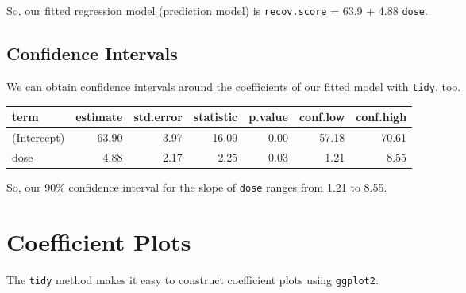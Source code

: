 \documentclass[
]{book}
\newenvironment{Shaded}{\begin{snugshade}}{\end{snugshade}}
\newcommand{\DataTypeTok}[1]{\textcolor[rgb]{0.13,0.29,0.53}{#1}}
\newcommand{\DecValTok}[1]{\textcolor[rgb]{0.00,0.00,0.81}{#1}}
\newcommand{\FloatTok}[1]{\textcolor[rgb]{0.00,0.00,0.81}{#1}}
\newcommand{\KeywordTok}[1]{\textcolor[rgb]{0.13,0.29,0.53}{\textbf{#1}}}
\newcommand{\NormalTok}[1]{#1}
\newcommand{\OperatorTok}[1]{\textcolor[rgb]{0.81,0.36,0.00}{\textbf{#1}}}
\newcommand{\OtherTok}[1]{\textcolor[rgb]{0.56,0.35,0.01}{#1}}
\newcommand{\StringTok}[1]{\textcolor[rgb]{0.31,0.60,0.02}{#1}}
\begin{document}
So, our fitted regression model (prediction model) is \texttt{recov.score} = 63.9 + 4.88 \texttt{dose}.

\hypertarget{confidence-intervals}{%
\subsection{Confidence Intervals}\label{confidence-intervals}}

We can obtain confidence intervals around the coefficients of our fitted model with \texttt{tidy}, too.

\begin{Shaded}
\end{Shaded}

\begin{tabular}{l|r|r|r|r|r|r}
\hline
term & estimate & std.error & statistic & p.value & conf.low & conf.high\\
\hline
(Intercept) & 63.90 & 3.97 & 16.09 & 0.00 & 57.18 & 70.61\\
\hline
dose & 4.88 & 2.17 & 2.25 & 0.03 & 1.21 & 8.55\\
\hline
\end{tabular}

So, our 90\% confidence interval for the slope of \texttt{dose} ranges from 1.21 to 8.55.

\hypertarget{coefficient-plots}{%
\section{Coefficient Plots}\label{coefficient-plots}}

The \texttt{tidy} method makes it easy to construct coefficient plots using \texttt{ggplot2}.
\end{document}
